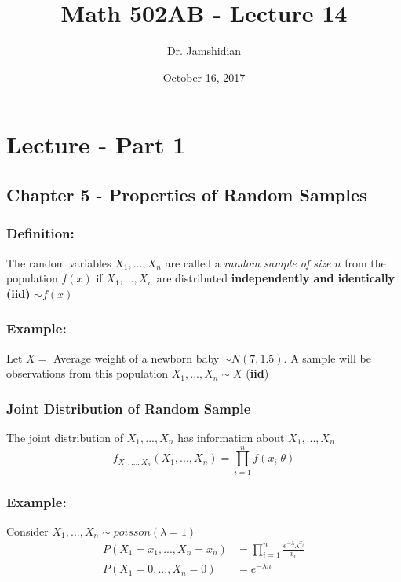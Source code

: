 \documentclass{article}
\title{Math 502AB - Lecture 14}
\author{Dr. Jamshidian}
\date{October 16, 2017}
\begin{document}
\maketitle

\section{Lecture - Part 1}

\subsection{Chapter 5 - Properties of Random Samples}

\subsubsection*{Definition:}

The random variables $X_1,...,X_n$ are called a \textit{random sample of size} $n$ from the population $f(x)$ if $X_1,...,X_n$ are distributed \textbf{independently and identically (iid)} $\sim f(x)$

\subsubsection*{Example:}
Let $X = $ Average weight of a newborn baby $\sim N(7,1.5)$. A sample will be observations from this population $X_1,...,X_n \sim X$ (\textbf{iid})

\subsubsection{Joint Distribution of Random Sample}

\noindent The joint distribution of $X_1,...,X_n$ has information about $X_1,...,X_n$
\begin{equation*}
    f_{X_1,...,X_n}(X_1,...,X_n) = \prod_{i=1}^n f(x_i | \theta)
\end{equation*}

\subsubsection*{Example:}

Consider $X_1,...,X_n \sim poisson(\lambda = 1)$
\begin{equation*}
\begin{split}
    P(X_1=x_1,...,X_n = x_n) &= \prod_{i=1}^n \frac{e^{-\lambda}\lambda^{x_i}}{x_i!}\\
    P(X_1 = 0,...,X_n = 0) &= e^{-\lambda n}
\end{split}
\end{equation*}
\end{document}
